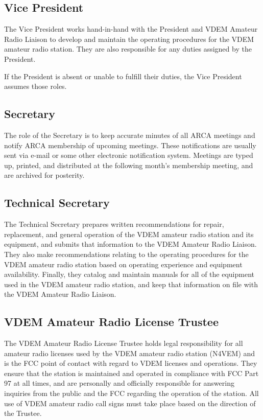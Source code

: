 \documentclass[pdflatex,letterpaper,twoside,12pt]{book}
\begin{document}
\subsection{Vice President}

The Vice President works hand-in-hand with the President and VDEM Amateur Radio Liaison to develop and maintain the operating procedures for the VDEM amateur radio station. They are also responsible for any duties assigned by the President.

If the President is absent or unable to fulfill their duties, the Vice President assumes those roles.

\subsection{Secretary}

The role of the Secretary is to keep accurate minutes of all ARCA meetings and notify ARCA membership of upcoming meetings.  These notifications are usually sent via e-mail or some other electronic notification system.  Meetings are typed up, printed, and distributed at the following month's membership meeting, and are archived for posterity.

\subsection{Technical Secretary}

The Technical Secretary prepares written recommendations for repair, replacement, and general operation of the VDEM amateur radio station and its equipment, and submits that information to the VDEM Amateur Radio Liaison.  They also make recommendations relating to the operating procedures for the VDEM amateur radio station based on operating experience and equipment availability.  Finally, they catalog and maintain manuals for all of the equipment used in the VDEM amateur radio station, and keep that information on file with the VDEM Amateur Radio Liaison.

\subsection{VDEM Amateur Radio License Trustee}

The VDEM Amateur Radio License Trustee holds legal responsibility for all amateur radio licenses used by the VDEM amateur radio station (N4VEM) and is the FCC point of contact with regard to VDEM licenses and operations.  They ensure that the station is maintained and operated in compliance with FCC Part 97 at all times, and are personally and officially responsible for answering inquiries from the public and the FCC regarding the operation of the station.  All use of VDEM amateur radio call signs must take place based on the direction of the Trustee.
\end{document}
